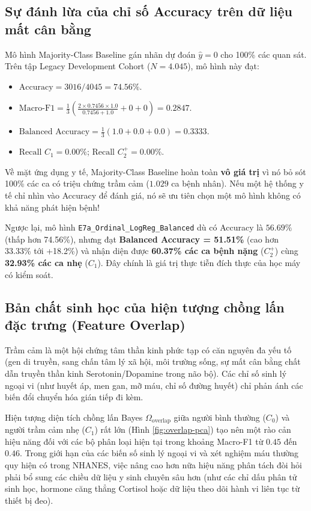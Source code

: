 \subsection{Sự đánh lừa của chỉ số Accuracy trên dữ liệu mất cân bằng}
Mô hình Majority-Class Baseline gán nhãn dự đoán $\hat{y} = 0$ cho 100\% các quan sát. Trên tập Legacy Development Cohort ($N = 4.045$), mô hình này đạt:
\begin{itemize}
    \item $\text{Accuracy} = 3016 / 4045 = \mathbf{74.56\%}$.
    \item $\text{Macro-F1} = \frac{1}{3} \left( \frac{2 \times 0.7456 \times 1.0}{0.7456 + 1.0} + 0 + 0 \right) = \mathbf{0.2847}$.
    \item $\text{Balanced Accuracy} = \frac{1}{3} (1.0 + 0.0 + 0.0) = \mathbf{0.3333}$.
    \item $\text{Recall } C_1 = \mathbf{0.00\%}$; $\text{Recall } C_2^+ = \mathbf{0.00\%}$.
\end{itemize}

Về mặt ứng dụng y tế, Majority-Class Baseline hoàn toàn \textbf{vô giá trị} vì nó bỏ sót 100\% các ca có triệu chứng trầm cảm ($1.029$ ca bệnh nhân). Nếu một hệ thống y tế chỉ nhìn vào Accuracy để đánh giá, nó sẽ ưu tiên chọn một mô hình không có khả năng phát hiện bệnh!

Ngược lại, mô hình \texttt{E7a\_Ordinal\_LogReg\_Balanced} dù có Accuracy là $56.69\%$ (thấp hơn 74.56\%), nhưng đạt \textbf{Balanced Accuracy = 51.51\%} (cao hơn 33.33\% tới +18.2\%) và nhận diện được \textbf{60.37\% các ca bệnh nặng} ($C_2^+$) cùng \textbf{32.93\% các ca nhẹ} ($C_1$). Đây chính là giá trị thực tiễn đích thực của học máy có kiểm soát.

\subsection{Bản chất sinh học của hiện tượng chồng lấn đặc trưng (Feature Overlap)}
Trầm cảm là một hội chứng tâm thần kinh phức tạp có căn nguyên đa yếu tố (gen di truyền, sang chấn tâm lý xã hội, môi trường sống, sự mất cân bằng chất dẫn truyền thần kinh Serotonin/Dopamine trong não bộ). Các chỉ số sinh lý ngoại vi (như huyết áp, men gan, mỡ máu, chỉ số đường huyết) chỉ phản ánh các biến đổi chuyển hóa gián tiếp đi kèm. 

Hiện tượng diện tích chồng lấn Bayes $\Omega_{\text{overlap}}$ giữa người bình thường ($C_0$) và người trầm cảm nhẹ ($C_1$) rất lớn (Hình \ref{fig:overlap-pca}) tạo nên một rào cản hiệu năng đối với các bộ phân loại hiện tại trong khoảng Macro-F1 từ $0.45$ đến $0.46$. Trong giới hạn của các biến số sinh lý ngoại vi và xét nghiệm máu thường quy hiện có trong NHANES, việc nâng cao hơn nữa hiệu năng phân tách đòi hỏi phải bổ sung các chiều dữ liệu y sinh chuyên sâu hơn (như các chỉ dấu phân tử sinh học, hormone căng thẳng Cortisol hoặc dữ liệu theo dõi hành vi liên tục từ thiết bị đeo).

